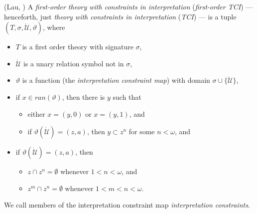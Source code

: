 \documentclass[12pt]{article}
\numberwithin{equation}{section}
\begin{document}
\begin{defi}(Lau, \cite{myself})
A \emph{first-order theory with constraints in interpretation} (\emph{first-order TCI}) --- henceforth, just \emph{theory with constraints in interpretation} (\emph{TCI}) --- is a tuple $(T, \sigma, \dot{\mathcal{U}}, \vartheta)$, where
\begin{itemize}
    \item $T$ is a first order theory with signature $\sigma$,
    \item $\dot{\mathcal{U}}$ is a unary relation symbol not in $\sigma$,
    \item $\vartheta$ is a function (the \emph{interpretation constraint map}) with domain $\sigma \cup \{\dot{\mathcal{U}}\}$, 
    \item if $x \in ran(\vartheta)$, then there is $y$ such that 
    \begin{itemize}[label=$\circ$]
        \item either $x = (y, 0)$ or $x = (y, 1)$, and
        \item if $\vartheta(\dot{\mathcal{U}}) = (z, a)$, then $y \subset z^n$ for some $n < \omega$, and
    \end{itemize}
    \item if $\vartheta(\dot{\mathcal{U}}) = (z, a)$, then 
    \begin{itemize}[label=$\circ$]
        \item $z \cap z^n = \emptyset$ whenever $1 < n < \omega$, and
        \item $z^m \cap z^n = \emptyset$ whenever $1 < m < n < \omega$.
    \end{itemize}
\end{itemize}
\end{defi}

We call members of the interpretation constraint map \emph{interpretation constraints}.
\end{document}
